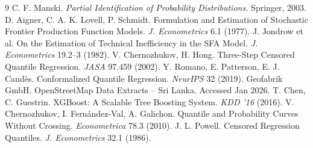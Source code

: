 \documentclass[10pt,a4paper]{article}
\begin{document}
\begin{thebibliography}{9}
\small
{} C. F. Manski. \emph{Partial Identification of Probability Distributions.} Springer, 2003.
 D. Aigner, C. A. K. Lovell, P. Schmidt. Formulation and Estimation of Stochastic Frontier Production Function Models. \emph{J. Econometrics} 6.1 (1977).
 J. Jondrow et al. On the Estimation of Technical Inefficiency in the SFA Model. \emph{J. Econometrics} 19.2--3 (1982).
 V. Chernozhukov, H. Hong. Three-Step Censored Quantile Regression. \emph{JASA} 97.459 (2002).
 Y. Romano, E. Patterson, E. J. Cand\`es. Conformalized Quantile Regression. \emph{NeurIPS} 32 (2019).
 Geofabrik GmbH. OpenStreetMap Data Extracts -- Sri Lanka. Accessed Jan 2026.
 T. Chen, C. Guestrin. XGBoost: A Scalable Tree Boosting System. \emph{KDD '16} (2016).
 V. Chernozhukov, I. Fern\'andez-Val, A. Galichon. Quantile and Probability Curves Without Crossing. \emph{Econometrica} 78.3 (2010).
 J. L. Powell. Censored Regression Quantiles. \emph{J. Econometrics} 32.1 (1986).
\end{thebibliography}
\end{document}
